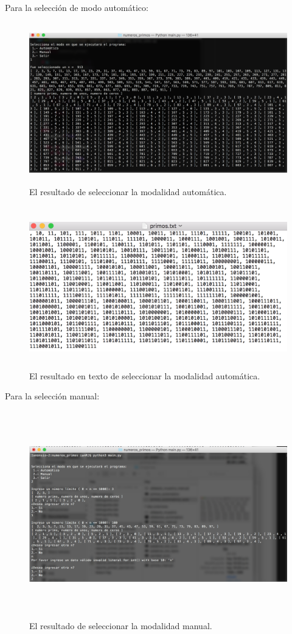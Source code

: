 \documentclass[12pt]{article}
\begin{document}
Para la selección de modo automático:
\begin{figure}[H]
\includegraphics[width=\textwidth, height=7cm]{primos_automatico}
\caption{El resultado de seleccionar la modalidad automática.}
\label{fig:primos_automatico}
\end{figure}

\begin{figure}[H]
\includegraphics[width=\textwidth, height=7cm]{primos_automatico_texto}
\caption{El resultado en texto de seleccionar la modalidad automática.}
\label{fig:primos_automatico}
\end{figure}

\vspace{3em}

Para la selección manual:
\begin{figure}[H]
\includegraphics[width=\textwidth, height=9cm]{primos_manual}
\caption{El resultado de seleccionar la modalidad manual.}
\label{fig:primos_manual}
\end{figure}
\end{document}
